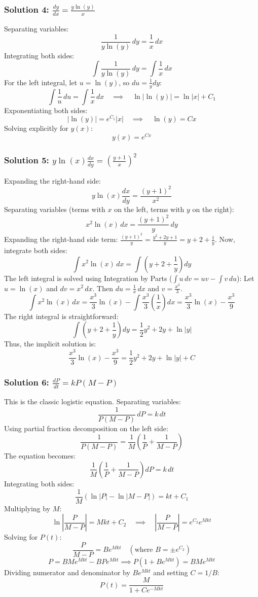 \documentclass[11pt,letterpaper]{article}
\begin{document}
\subsubsection*{Solution 4: $\frac{dy}{dx} = \frac{y\ln(y)}{x}$}
Separating variables:
\[ \frac{1}{y\ln(y)} \, dy = \frac{1}{x} \, dx \]
Integrating both sides:
\[ \int \frac{1}{y\ln(y)} \, dy = \int \frac{1}{x} \, dx \]
For the left integral, let $u = \ln(y)$, so $du = \frac{1}{y} dy$:
\[ \int \frac{1}{u} \, du = \int \frac{1}{x} \, dx \quad \implies \quad \ln|\ln(y)| = \ln|x| + C_1 \]
Exponentiating both sides:
\[ |\ln(y)| = e^{C_1} |x| \quad \implies \quad \ln(y) = C x \]
Solving explicitly for $y(x)$:
\[ y(x) = e^{C x} \]

\subsubsection*{Solution 5: $y \ln(x) \frac{dx}{dy} = \left(\frac{y+1}{x}\right)^2$}
Expanding the right-hand side:
\[ y \ln(x) \frac{dx}{dy} = \frac{(y+1)^2}{x^2} \]
Separating variables (terms with $x$ on the left, terms with $y$ on the right):
\[ x^2 \ln(x) \, dx = \frac{(y+1)^2}{y} \, dy \]
Expanding the right-hand side term: $\frac{(y+1)^2}{y} = \frac{y^2 + 2y + 1}{y} = y + 2 + \frac{1}{y}$.
Now, integrate both sides:
\[ \int x^2 \ln(x) \, dx = \int \left( y + 2 + \frac{1}{y} \right) dy \]
The left integral is solved using Integration by Parts ($\int u \, dv = uv - \int v \, du$):
Let $u = \ln(x)$ and $dv = x^2 \, dx$. Then $du = \frac{1}{x} \, dx$ and $v = \frac{x^3}{3}$.
\[ \int x^2 \ln(x) \, dx = \frac{x^3}{3}\ln(x) - \int \frac{x^3}{3}\left(\frac{1}{x}\right) dx = \frac{x^3}{3}\ln(x) - \frac{x^3}{9} \]
The right integral is straightforward:
\[ \int \left( y + 2 + \frac{1}{y} \right) dy = \frac{1}{2}y^2 + 2y + \ln|y| \]
Thus, the implicit solution is:
\[ \frac{x^3}{3}\ln(x) - \frac{x^3}{9} = \frac{1}{2}y^2 + 2y + \ln|y| + C \]

\subsubsection*{Solution 6: $\frac{dP}{dt} = k P(M - P)$}
This is the classic logistic equation. Separating variables:
\[ \frac{1}{P(M-P)} \, dP = k \, dt \]
Using partial fraction decomposition on the left side:
\[ \frac{1}{P(M-P)} = \frac{1}{M}\left( \frac{1}{P} + \frac{1}{M-P} \right) \]
The equation becomes:
\[ \frac{1}{M} \left( \frac{1}{P} + \frac{1}{M-P} \right) dP = k \, dt \]
Integrating both sides:
\[ \frac{1}{M} \left( \ln|P| - \ln|M-P| \right) = kt + C_1 \]
Multiplying by $M$:
\[ \ln\left| \frac{P}{M-P} \right| = Mkt + C_2 \quad \implies \quad \left| \frac{P}{M-P} \right| = e^{C_2} e^{Mkt} \]
Solving for $P(t)$:
\[ \frac{P}{M-P} = B e^{Mkt} \quad (\text{where } B = \pm e^{C_2}) \]
\[ P = B M e^{Mkt} - B P e^{Mkt} \implies P(1 + B e^{Mkt}) = B M e^{Mkt} \]
Dividing numerator and denominator by $B e^{Mkt}$ and setting $C = 1/B$:
\[ P(t) = \frac{M}{1 + C e^{-Mkt}} \]
\end{document}
